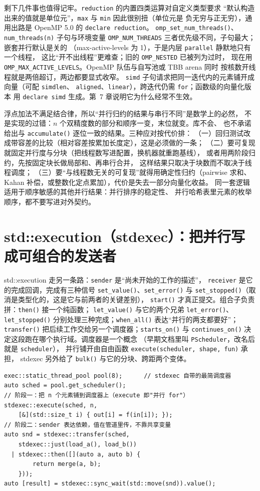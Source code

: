 \documentclass[12pt,a4paper,fontset=fandol]{ctexbook}
\newcommand{\Fn}[1]{\texttt{#1()}}
\newcommand{\Tp}[1]{\texttt{#1}}
\begin{document}
剩下几件事也值得记牢。\Tp{reduction} 的内置四类运算对自定义类型要求
``默认构造出来的值就是单位元''，\Tp{max} 与 \Tp{min} 因此很别扭（单位元是
负无穷与正无穷），通用出路是 OpenMP 5.0 的 \Tp{declare reduction}。
\Fn{omp\_set\_num\_threads}、\Tp{num\_threads(n)} 子句与环境变量
\Tp{OMP\_NUM\_THREADS} 三者优先级不同，子句最大；嵌套并行默认是关的
（max-active-levels 为 1），于是内层 \Tp{parallel} 静默地只有一个线程，
这比``开不出线程''更难查；旧的 \Tp{OMP\_NESTED} 已被列为过时，
现在用 \Tp{OMP\_MAX\_ACTIVE\_LEVELS}。OpenMP 队伍与自写池或 TBB arena 同时
按核数开线程就是两倍超订，两边都要显式收窄。
\Tp{simd} 子句请求把同一迭代内的元素铺开成向量（可配 \Tp{simdlen}、
\Tp{aligned}、\Tp{linear}），跨迭代仍需 \Tp{for}；函数级的向量化版本
用 \Tp{declare simd} 生成。第~7 章说明它为什么经常不生效。

\begin{note}[title={浮点归约结果不确定：这是特性不是 bug}]
浮点加法不满足结合律，所以``并行归约的结果与串行不同''是数学上的必然，
不是实现的过错：$n$ 个双精度数的部分和顺序一变，末位就变。库不会、
也不承诺给出与 \Fn{accumulate} 逐位一致的结果。三种应对按代价排：
（一）回归测试改成带容差的比较（相对容差按累加长度定），这是必须做的一条；
（二）要可复现就固定并行度与分块（把线程数写进配置，换机器就重跑基线），
或者用两阶段归约，先按固定块长做局部和、再串行合并，
这样结果只取决于块数而不取决于线程调度；
（三）要``与线程数无关的可复现''就得用确定性归约（pairwise 求和、
Kahan 补偿，或整数化定点累加），代价是失去一部分向量化收益。
同一套逻辑适用于顺序敏感的其他并行结果：并行排序的稳定性、
并行哈希表里元素的枚举顺序，都不要写进对外契约。
\end{note}

\section{std::execution（stdexec）：把并行写成可组合的发送者}

std::execution 走另一条路：\Tp{sender} 是``尚未开始的工作的描述''，
\Tp{receiver} 是它的完成回调，完成有三种信号 \Fn{set\_value}、\Fn{set\_error}
与 \Fn{set\_stopped}（取消是类型化的，这是它与前两者的关键差别），
\Fn{start} 才真正提交。组合子负责拼：\Fn{then} 接一个纯函数；
\Fn{let\_value} 与它的两个兄弟 \Fn{let\_error}、\Fn{let\_stopped}
分别处理三种完成；\Fn{when\_all} 表达``并行的两支都要好''；
\Fn{transfer} 把后续工作交给另一个调度器；\Fn{starts\_on} 与
\Fn{continues\_on} 决定这段跑在哪个执行域。调度器是一个概念
（早期文档里叫 \Tp{PScheduler}，改名后就是 \Tp{scheduler}），
并行铺开由自由函数 \Tp{execute(scheduler, shape, fun)} 承担，
stdexec 另外给了 \Fn{bulk} 与它的分块、跨距两个变体。
\begin{lstlisting}[style=cppstyle,caption={stdexec 骨架：一次并行铺开加一条依赖管道}]
exec::static_thread_pool pool(8);      // stdexec 自带的最简调度器
auto sched = pool.get_scheduler();
// 阶段一：把 n 个元素铺到调度器上（execute 即"并行 for"）
stdexec::execute(sched, n,
    [&](std::size_t i) { out[i] = f(in[i]); });
// 阶段二：sender 表达依赖，值在管道里传，不靠共享变量
auto snd = stdexec::transfer(sched,
    stdexec::just(load_a(), load_b())
  | stdexec::then([](auto a, auto b) {
        return merge(a, b);
    }));
auto [result] = stdexec::sync_wait(std::move(snd)).value();
\end{lstlisting}
\end{document}
